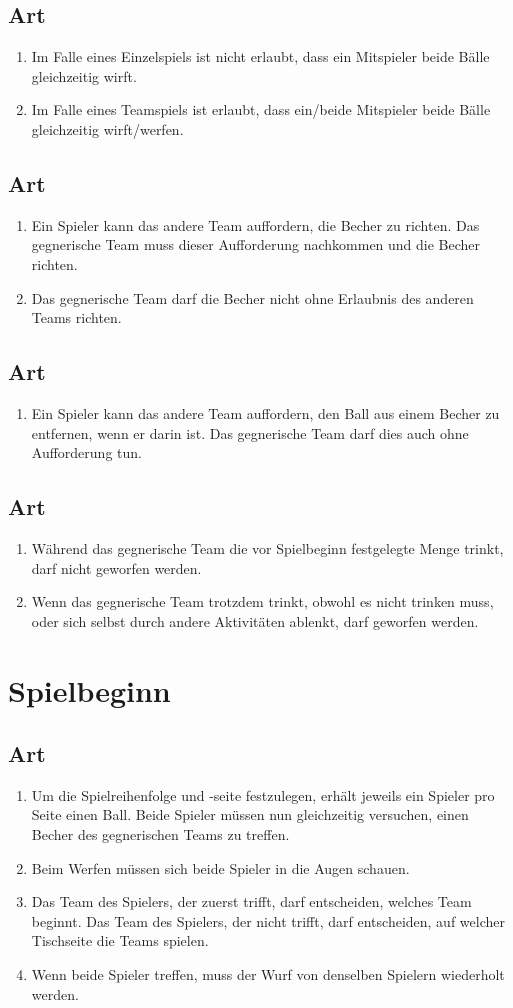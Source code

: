 \documentclass[a4paper,11pt]{scrartcl}
\newcommand{\enum}[1]{\begin{enumerate}[label=(\arabic*)]#1\end{enumerate}}
\newcommand{\art}[2]{\subsection*{#1} \enum{#2}}
\newcounter{art}
\begin{document}
    \art{Art \theart}{
        \item
            Im Falle eines Einzelspiels ist nicht erlaubt, dass ein Mitspieler beide Bälle gleichzeitig wirft.
        \item
            Im Falle eines Teamspiels ist erlaubt, dass ein/beide Mitspieler beide Bälle gleichzeitig wirft/werfen.
    }

    \art{Art \theart}{
        \item
            Ein Spieler kann das andere Team auffordern, die Becher zu richten. Das gegnerische Team muss dieser Aufforderung nachkommen und die Becher richten.
        \item
            Das gegnerische Team darf die Becher nicht ohne Erlaubnis des anderen Teams richten.
    }

    \art{Art \theart}{
        \item
            Ein Spieler kann das andere Team auffordern, den Ball aus einem Becher zu entfernen, wenn er darin ist. Das gegnerische Team darf dies auch ohne Aufforderung tun.
    }

    \art{Art \theart}{
        \item
            Während das gegnerische Team die vor Spielbeginn festgelegte Menge trinkt, darf nicht geworfen werden.
        \item
            Wenn das gegnerische Team trotzdem trinkt, obwohl es nicht trinken muss, oder sich selbst durch andere Aktivitäten ablenkt, darf geworfen werden.
    }

\section{Spielbeginn}
    \art{Art \theart}{
        \item
            Um die Spielreihenfolge und -seite festzulegen, erhält jeweils ein Spieler pro Seite einen Ball. Beide Spieler müssen nun gleichzeitig versuchen, einen Becher des gegnerischen Teams zu treffen.
        \item
            Beim Werfen müssen sich beide Spieler in die Augen schauen.
        \item
            Das Team des Spielers, der zuerst trifft, darf entscheiden, welches Team beginnt. Das Team des Spielers, der nicht trifft, darf entscheiden, auf welcher Tischseite die Teams spielen.
        \item
            Wenn beide Spieler treffen, muss der Wurf von denselben Spielern wiederholt werden.
    }
\end{document}
